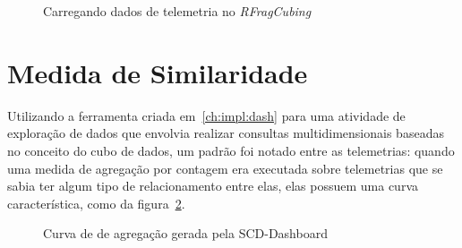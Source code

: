 \begin{figure}[ht]
  \caption{Carregando dados de telemetria no \textit{RFragCubing}}\label{fig:shinyrfrag}
	\vspace{6mm}
	\begin{center}
	\end{center}
	\vspace{4mm}
	\legenda{}
\end{figure}

\section{Medida de Similaridade}\label{ch:impl:similarity}

Utilizando a ferramenta criada em~\ref{ch:impl:dash} para uma atividade de exploração de dados que envolvia realizar consultas multidimensionais baseadas no conceito do cubo de dados, um padrão foi notado entre as telemetrias: quando uma medida de agregação por contagem era executada sobre telemetrias que se sabia ter algum tipo de relacionamento entre elas, elas possuem uma curva característica, como da figura~\ref{fig:scdsimilaritygraph}.

\begin{figure}[ht]
	\caption{Curva de de agregação gerada pela SCD-Dashboard}\label{fig:scdsimilaritygraph}
	\vspace{6mm}
	\begin{center}
	\end{center}
	\vspace{4mm}
\end{figure}

